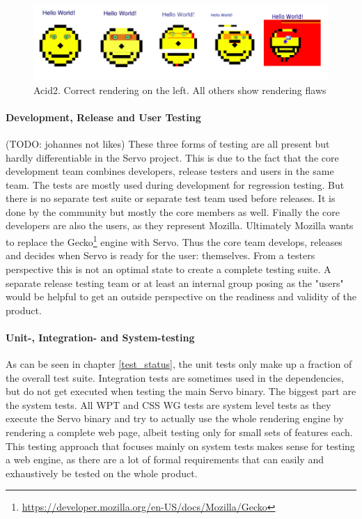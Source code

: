 \documentclass{scrartcl}
\newcommand{\todo}[1] {{\color{red}(TODO: #1)}}
\begin{document}
\begin{figure}[h]
    \centering
    \includegraphics[width=\textwidth]{acid2}
    \caption{Acid2. Correct rendering on the left. All others show rendering flaws}
\end{figure}

\paragraph{Development, Release and User Testing}
\todo{johannes not likes}
These three forms of testing are all present but hardly differentiable in the Servo project. This is due to the fact that the core development team combines developers, release testers and users in the same team. The tests are mostly used during development for regression testing. But there is no separate test suite or separate test team used before releases. It is done by the community but mostly the core members as well. Finally the core developers are also the users, as they represent Mozilla. Ultimately Mozilla wants to replace the Gecko\footnote{\url{https://developer.mozilla.org/en-US/docs/Mozilla/Gecko}} engine with Servo. Thus the core team develops, releases and decides when Servo is ready for the user: themselves. From a testers perspective this is not an optimal state to create a complete testing suite. A separate release testing team or at least an internal group posing as the "users" would be helpful to get an outside perspective on the readiness and validity of the product.

\paragraph{Unit-, Integration- and System-testing}
As can be seen in chapter \ref{test_status}, the unit tests only make up a fraction of the overall test suite. Integration tests are sometimes used in the dependencies, but do not get executed when testing the main Servo binary. The biggest part are the system tests. All WPT and CSS WG tests are system level tests as they execute the Servo binary and try to actually use the whole rendering engine by rendering a complete web page, albeit testing only for small sets of features each. This testing approach that focuses mainly on system tests makes sense for testing a web engine, as there are a lot of formal requirements that can easily and exhaustively be tested on the whole product.
\end{document}

